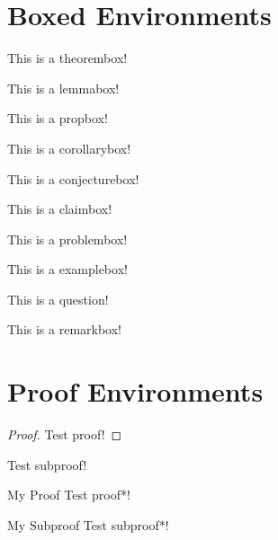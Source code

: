 \documentclass{scrartcl}
\begin{document}
\section{Boxed Environments}
\begin{theorembox}
    This is a theorembox!
\end{theorembox}
\begin{lemmabox}
    This is a lemmabox!
\end{lemmabox}
\begin{propbox}
    This is a propbox!
\end{propbox}
\begin{corollarybox}
    This is a corollarybox!
\end{corollarybox}
\begin{conjecturebox}
    This is a conjecturebox!
\end{conjecturebox}
\begin{claimbox}
    This is a claimbox!
\end{claimbox}
\begin{problembox}
    This is a problembox!
\end{problembox}
\begin{examplebox}
    This is a examplebox!
\end{examplebox}
\begin{questionbox}
    This is a question!
\end{questionbox}
\begin{remarkbox}
    This is a remarkbox!
\end{remarkbox}

\newpage

\section{Proof Environments}
\begin{proof}
    Test proof!
\end{proof}
\begin{subproof}
    Test subproof!
\end{subproof}
\begin{proof*}{My Proof}
    Test proof*!
\end{proof*}
\begin{subproof*}{My Subproof}
    Test subproof*!
\end{subproof*}
\end{document}
